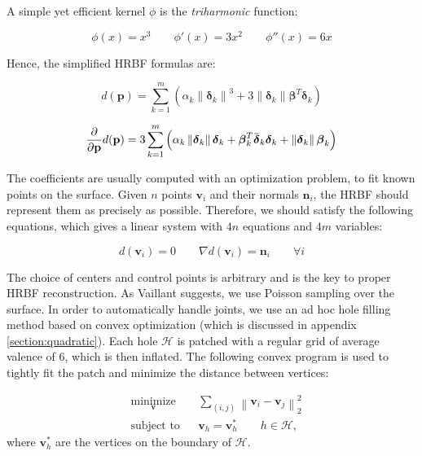 \documentclass[a4paper,10pt]{article}
\newcommand{\overbar}[1]{\mkern 1.5mu\overline{\mkern-1.5mu#1\mkern-1.5mu}\mkern 1.5mu}
\begin{document}
\begin{multicols}{2}
A simple yet efficient kernel $\phi$ is the \emph{triharmonic} function:

\begin{equation*}
\phi(x) = x^3 \qquad
\phi'(x) = 3x^2 \qquad
\phi''(x) = 6x
\end{equation*}

Hence, the simplified HRBF formulas are:

\begin{equation*}
d(\mathbf{p}) = \sum_{k=1}^m \left(\alpha_k \left\| \boldsymbol\delta_k \right\|^3 + 3\left\| \boldsymbol\delta_k \right\| \boldsymbol\beta^T \boldsymbol\delta_k \right)
\end{equation*}

\begin{equation*}
\frac{\partial}{\partial \mathbf{p}} d(\mathbf{p}) = 3\sum_{k=1}^m \left(\alpha_k \left\| \boldsymbol\delta_k \right\| \boldsymbol\delta_k +
\boldsymbol\beta_k^T \overbar{\boldsymbol\delta}_k \boldsymbol\delta_k +
\left\| \boldsymbol\delta_k \right\| \boldsymbol\beta_k \right)
\end{equation*}

The coefficients are usually computed with an optimization problem, to fit known points on the surface.
Given $n$ points $\mathbf{v}_i$ and their normals $\mathbf{n}_i$, the HRBF should represent them as precisely as possible.
Therefore, we should satisfy the following equations, which gives a linear system with $4n$ equations and $4m$ variables:

\begin{equation*}
d(\mathbf{v}_i) = 0 \qquad \nabla d(\mathbf{v}_i) = \mathbf{n}_i \qquad \forall i
\end{equation*}

The choice of centers and control points is arbitrary and is the key to proper HRBF reconstruction.
As Vaillant suggests, we use Poisson sampling over the surface.
In order to automatically handle joints, we use an ad hoc hole filling method based on convex optimization (which is discussed in appendix \ref{section:quadratic}).
Each hole $\mathcal{H}$ is patched with a regular grid of average valence of 6, which is then inflated.
The following convex program is used to tightly fit the patch and minimize the distance between vertices:

\begin{equation*}
\begin{aligned}
& \underset{\mathbf{v}}{\text{minimize}} & & \sum_{(i, j)} \left\| \mathbf{v}_i - \mathbf{v}_j \right\|_2^2 \\
& \text{subject to} & & \mathbf{v}_h = \mathbf{v}_h^* \qquad h \in \mathcal{H},
\end{aligned}
\end{equation*}
where $\mathbf{v}_h^*$ are the vertices on the boundary of $\mathcal{H}$.



\end{multicols}
\end{document}
